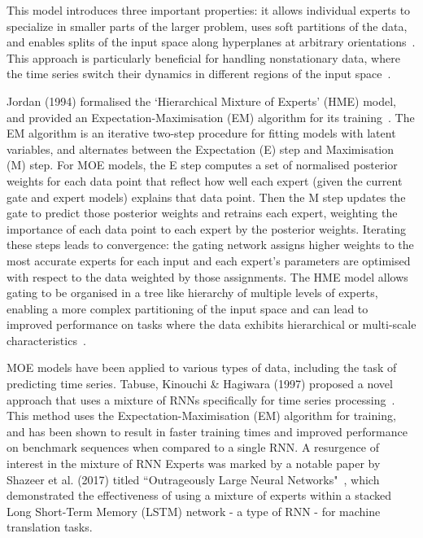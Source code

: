 This model introduces three important properties: it allows individual experts to specialize in smaller parts of the larger problem, uses soft partitions of the data, and enables splits of the input space along hyperplanes at arbitrary orientations~\cite{jordan_1994}. This approach is particularly beneficial for handling nonstationary data, where the time series switch their dynamics in different regions of the input space~\cite{yuksel_2012}.

Jordan (1994) formalised the `Hierarchical Mixture of Experts' (HME) model, and provided an Expectation-Maximisation (EM) algorithm for its training~\cite{jordan_1994}. The EM algorithm is an iterative two-step procedure for fitting models with latent variables, and alternates between the Expectation (E) step and Maximisation (M) step. For MOE models, the E step computes a set of normalised posterior weights for each data point that reflect how well each expert (given the current gate and expert models) explains that data point. Then the M step updates the gate to predict those posterior weights and retrains each expert, weighting the importance of each data point to each expert by the posterior weights. Iterating these steps leads to convergence: the gating network assigns higher weights to the most accurate experts for each input and each expert's parameters are optimised with respect to the data weighted by those assignments. The HME model allows gating to be organised in a tree like hierarchy of multiple levels of experts, enabling a more complex partitioning of the input space and can lead to improved performance on tasks where the data exhibits hierarchical or multi-scale characteristics~\cite{jordan_1994}.

MOE models have been applied to various types of data, including the task of predicting time series. Tabuse, Kinouchi \& Hagiwara (1997) proposed a novel approach that uses a mixture of RNNs specifically for time series processing~\cite{tabuse_kinouchi_and_hagiwara_1997}. This method uses the Expectation-Maximisation (EM) algorithm for training, and has been shown to result in faster training times and improved performance on benchmark sequences when compared to a single RNN. A resurgence of interest in the mixture of RNN Experts was marked by a notable paper by Shazeer et al. (2017) titled ``Outrageously Large Neural Networks"~\cite{shazeer_2017}, which demonstrated the effectiveness of using a mixture of experts within a stacked Long Short-Term Memory (LSTM) network - a type of RNN - for machine translation tasks.

